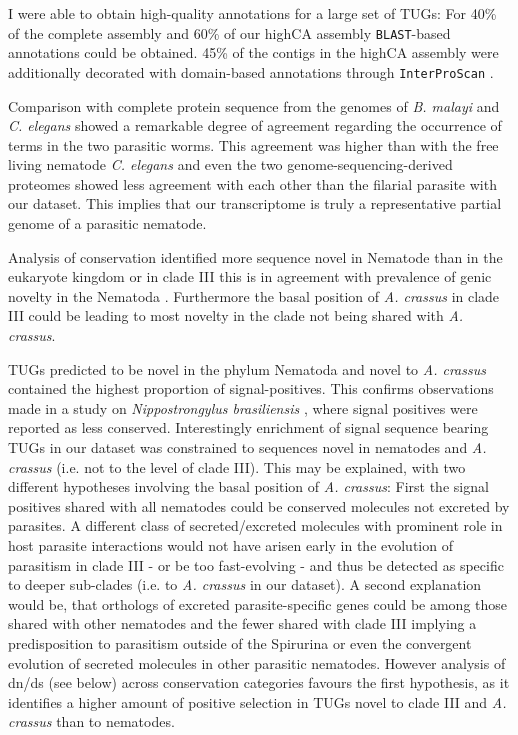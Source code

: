 I were able to obtain high-quality annotations for a large set of
TUGs: For 40\% of the complete assembly and 60\% of our highCA
assembly \texttt{BLAST}-based annotations could be obtained. 45\% of
the contigs in the highCA assembly were additionally decorated with
domain-based annotations through \texttt{InterProScan}
\cite{pmid11590104}.

Comparison with complete protein sequence from the genomes of
\textit{B. malayi} and \textit{C. elegans} showed a remarkable degree
of agreement regarding the occurrence of terms in the two parasitic
worms. This agreement was higher than with the free living nematode
\textit{C. elegans} and even the two genome-sequencing-derived
proteomes showed less agreement with each other than the filarial
parasite with our dataset. This implies that our transcriptome is
truly a representative partial genome
\cite{parkinson_partigene--constructing_2004} of a parasitic nematode.

Analysis of conservation identified more sequence novel in Nematode
than in the eukaryote kingdom or in clade III this is in agreement
with prevalence of genic novelty in the Nematoda
\cite{wasmuth_extent_2008}. Furthermore the basal position of
\textit{A. crassus} in clade III could be leading to most novelty in
the clade not being shared with \textit{A. crassus}.

TUGs predicted to be novel in the phylum Nematoda and novel to
\textit{A. crassus} contained the highest proportion of
signal-positives. This confirms observations made in a study on
\textit{Nippostrongylus brasiliensis} \cite{harcus_signal_2004}, where
signal positives were reported as less conserved. Interestingly
enrichment of signal sequence bearing TUGs in our dataset was
constrained to sequences novel in nematodes and \textit{A. crassus}
(i.e. not to the level of clade III). This may be explained, with two
different hypotheses involving the basal position of
\textit{A. crassus}: First the signal positives shared with all
nematodes could be conserved molecules not excreted by parasites. A
different class of secreted/excreted molecules with prominent role in
host parasite interactions would not have arisen early in the
evolution of parasitism in clade III - or be too fast-evolving - and
thus be detected as specific to deeper sub-clades (i.e. to
\textit{A. crassus} in our dataset). A second explanation would be,
that orthologs of excreted parasite-specific genes could be among
those shared with other nematodes and the fewer shared with clade III
implying a predisposition to parasitism outside of the Spirurina or
even the convergent evolution of secreted molecules in other parasitic
nematodes. However analysis of dn/ds (see below) across conservation
categories favours the first hypothesis, as it identifies a higher
amount of positive selection in TUGs novel to clade III and
\textit{A. crassus} than to nematodes.

